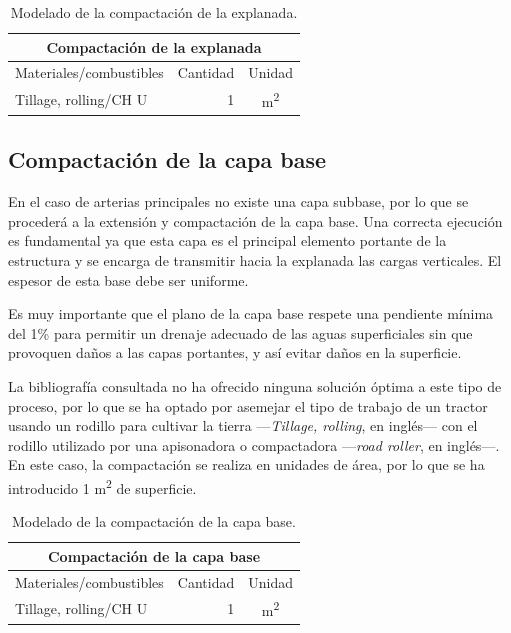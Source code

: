 \begin{table}[!htb]
\centering
\begin{tabular}{p{8cm}rc}
\toprule
\multicolumn{3}{c}{Compactación de la explanada}\\
\midrule
Materiales/combustibles & Cantidad & Unidad\\
\midrule
Tillage, rolling/CH U & 1 & \si{m^2}\\
\bottomrule
\end{tabular}
\caption{Modelado de la compactación de la explanada.}
\label{modeladoexplanada}
\end{table}

\subsection{Compactación de la capa base}

En el caso de arterias principales no existe una capa subbase, por lo que se procederá a la extensión y compactación de la capa base. Una correcta ejecución es fundamental ya que esta capa es el principal elemento portante de la estructura y se encarga de transmitir hacia la explanada las cargas verticales. El espesor de esta base debe ser uniforme.

Es muy importante que el plano de la capa base respete una pendiente mínima del 1\% para permitir un drenaje adecuado de las aguas superficiales sin que provoquen daños a las capas portantes, y así evitar daños en la superficie.

La bibliografía consultada no ha ofrecido ninguna solución óptima a este tipo de proceso, por lo que se ha optado por asemejar el tipo de trabajo de un tractor usando un rodillo para cultivar la tierra —\textit{Tillage, rolling}, en inglés— con el rodillo utilizado por una apisonadora o compactadora —\textit{road roller}, en inglés—. En este caso, la compactación se realiza en unidades de área, por lo que se ha introducido 1 \si{m^2} de superficie.

\begin{table}[!htb]
\centering
\begin{tabular}{p{8cm}rc}
\toprule
\multicolumn{3}{c}{Compactación de la capa base}\\
\midrule
Materiales/combustibles & Cantidad & Unidad\\
\midrule
Tillage, rolling/CH U & 1 & \si{m^2}\\
\bottomrule
\end{tabular}
\caption{Modelado de la compactación de la capa base.}
\label{modeladocapabase}
\end{table}

